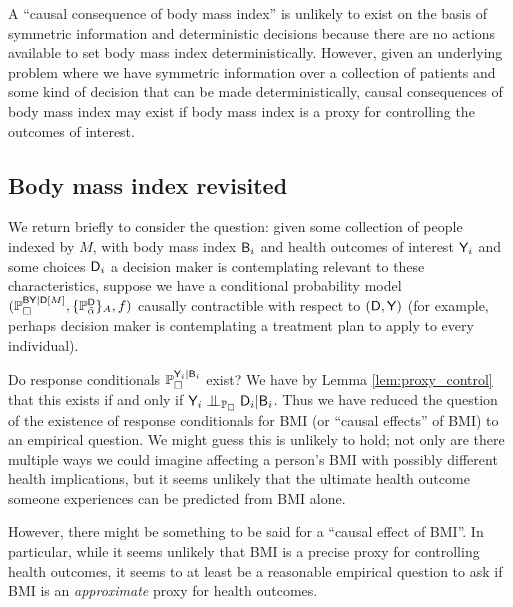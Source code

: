 A ``causal consequence of body mass index'' is unlikely to exist on the basis of symmetric information and deterministic decisions because there are no actions available to set body mass index deterministically. However, given an underlying problem where we have symmetric information over a collection of patients and some kind of decision that can be made deterministically, causal consequences of body mass index may exist if body mass index is a proxy for controlling the outcomes of interest.

\subsection{Body mass index revisited}

We return briefly to consider the question: given some collection of people indexed by $M$, with body mass index $\mathsf{B}_i$ and health outcomes of interest $\mathsf{Y}_i$ and some choices $\mathsf{D}_i$ a decision maker is contemplating relevant to these characteristics, suppose we have a conditional probability model $(\mathbb{P}_\square^{\mathsf{BY}|\mathsf{D}[M]},\{\mathbb{P}_{\tilde{\alpha}}^{\mathsf{D}}\}_A,f)$ causally contractible with respect to $(\mathsf{D},\mathsf{Y})$ (for example, perhaps decision maker is contemplating a treatment plan to apply to every individual).

Do response conditionals $\mathbb{P}_\square^{\mathsf{Y}_i|\mathsf{B}_i}$ exist? We have by Lemma \ref{lem:proxy_control} that this exists if and only if $\RV{Y}_i\CI_{\prob{P}_\square} \RV{D}_i|\RV{B}_i$. Thus we have reduced the question of the existence of response conditionals for BMI (or ``causal effects'' of BMI) to an empirical question. We might guess this is unlikely to hold; not only are there multiple ways we could imagine affecting a person's BMI with possibly different health implications, but it seems unlikely that the ultimate health outcome someone experiences can be predicted from BMI alone.

However, there might be something to be said for a ``causal effect of BMI''. In particular, while it seems unlikely that BMI is a precise proxy for controlling health outcomes, it seems to at least be a reasonable empirical question to ask if BMI is an \emph{approximate} proxy for health outcomes.

